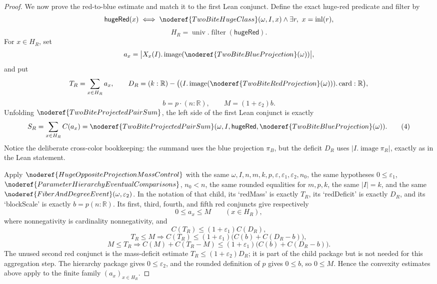 \begin{proof}
We now prove the red-to-blue estimate and match it to the first Lean
conjunct.  Define the exact huge-red predicate and filter by
\[
\mathsf{hugeRed}(x)\iff
\noderef{TwoBiteHugeClass}(\omega,I,x)\wedge
  \exists r,\ x=\operatorname{inl}(r),
\]
\[
H_R=\operatorname{univ}.\operatorname{filter}(\mathsf{hugeRed}).
\]
For \(x\in H_R\), set
\[
a_x=
\bigl|X_x(I).\operatorname{image}
  (\noderef{TwoBiteBlueProjection}(\omega))\bigr|,
\]
and put
\[
T_R=\sum_{x\in H_R}a_x,\qquad
D_R=(k:\mathbb R)-
  \bigl((I.\operatorname{image}
    (\noderef{TwoBiteRedProjection}(\omega))).\operatorname{card}:\mathbb R\bigr),
\]
\[
b=p\cdot(n:\mathbb R),\qquad M=(1+\varepsilon_2)b.
\]
Unfolding \(\noderef{TwoBiteProjectedPairSum}\), the left side of the first
Lean conjunct is exactly
\[
S_R=\sum_{x\in H_R}C(a_x)
=\noderef{TwoBiteProjectedPairSum}
  (\omega,I,\mathsf{hugeRed},\noderef{TwoBiteBlueProjection}(\omega)). \tag{4}
\]
Notice the deliberate cross-color bookkeeping: the summand uses the blue
projection \(\pi_B\), but the deficit \(D_R\) uses
\(|I.\operatorname{image}\pi_R|\), exactly as in the Lean statement.

Apply \(\noderef{HugeOppositeProjectionMassControl}\) with the same
\(\omega,I,n,m,k,p,\varepsilon,\varepsilon_1,\varepsilon_2,n_0\), the same
hypotheses \(0\le\varepsilon_1\),
\(\noderef{ParameterHierarchyEventualComparisons}\), \(n_0<n\), the same
rounded equalities for \(m,p,k\), the same \(|I|=k\), and the same
\(\noderef{FiberAndDegreeEvent}(\omega,\varepsilon_2)\).  In the notation of
that child, its `redMass' is exactly \(T_R\), its `redDeficit' is exactly
\(D_R\), and its `blockScale' is exactly \(b=p(n:\mathbb R)\).  Its
first, third, fourth, and fifth red conjuncts give respectively
\[
0\le a_x\le M\qquad(x\in H_R), \tag{5}
\]
where nonnegativity is cardinality nonnegativity, and
\[
C(T_R)\le(1+\varepsilon_1)C(D_R), \tag{6}
\]
\[
T_R\le M\Longrightarrow
C(T_R)\le
(1+\varepsilon_1)\bigl(C(b)+C(D_R-b)\bigr), \tag{7}
\]
\[
M\le T_R\Longrightarrow
C(M)+C(T_R-M)\le
(1+\varepsilon_1)\bigl(C(b)+C(D_R-b)\bigr). \tag{8}
\]
The unused second red conjunct is the mass-deficit estimate
\(T_R\le(1+\varepsilon_2)D_R\); it is part of the child package but is not
needed for this aggregation step.
The hierarchy package gives \(0\le\varepsilon_2\), and the rounded definition
of \(p\) gives \(0\le b\), so \(0\le M\).  Hence the convexity estimates above
apply to the finite family \((a_x)_{x\in H_R}\).


\end{proof}

